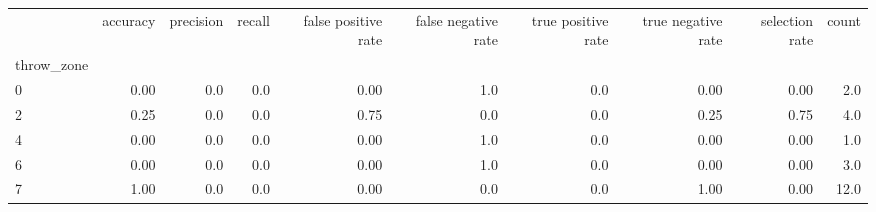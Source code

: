 \begin{tabular}{lrrrrrrrrr}
\toprule
{} &  accuracy &  precision &  recall &  false positive rate &  false negative rate &  true positive rate &  true negative rate &  selection rate &  count \\
throw\_zone &           &            &         &                      &                      &                     &                     &                 &        \\
\midrule
0          &      0.00 &        0.0 &     0.0 &                 0.00 &                  1.0 &                 0.0 &                0.00 &            0.00 &    2.0 \\
2          &      0.25 &        0.0 &     0.0 &                 0.75 &                  0.0 &                 0.0 &                0.25 &            0.75 &    4.0 \\
4          &      0.00 &        0.0 &     0.0 &                 0.00 &                  1.0 &                 0.0 &                0.00 &            0.00 &    1.0 \\
6          &      0.00 &        0.0 &     0.0 &                 0.00 &                  1.0 &                 0.0 &                0.00 &            0.00 &    3.0 \\
7          &      1.00 &        0.0 &     0.0 &                 0.00 &                  0.0 &                 0.0 &                1.00 &            0.00 &   12.0 \\
\bottomrule
\end{tabular}
